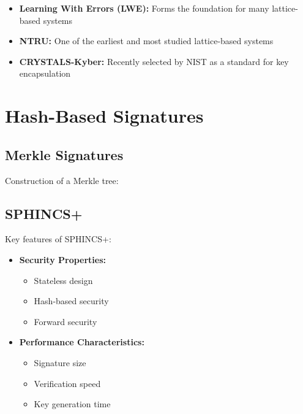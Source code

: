 \begin{itemize}
    \item \textbf{Learning With Errors (LWE):} Forms the foundation for many lattice-based systems
    \item \textbf{NTRU:} One of the earliest and most studied lattice-based systems
    \item \textbf{CRYSTALS-Kyber:} Recently selected by NIST as a standard for key encapsulation
\end{itemize}


\section{Hash-Based Signatures}\label{sec:hash_based}

\subsection{Merkle Signatures}\label{subsec:merkle}
Construction of a Merkle tree:


\subsection{SPHINCS+}\label{subsec:sphincs}
Key features of SPHINCS+:

\begin{itemize}
    \item \textbf{Security Properties:}
    \begin{itemize}
        \item Stateless design
        \item Hash-based security
        \item Forward security
    \end{itemize}
    \item \textbf{Performance Characteristics:}
    \begin{itemize}
        \item Signature size
        \item Verification speed
        \item Key generation time
    \end{itemize}
\end{itemize}

